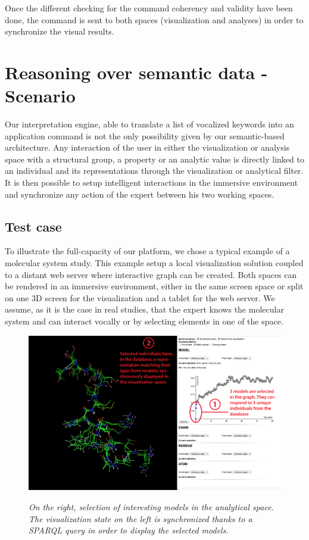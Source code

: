 \documentclass{vgtc}                          %
\begin{document}
Once the different checking for the command coherency and validity have been done, the command is sent to both spaces (visualization and analyses) in order to synchronize the visual results.

\section{Reasoning over semantic data - Scenario}

Our interpretation engine, able to translate a list of vocalized keywords into an application command is not the only possibility given by our semantic-based architecture. Any interaction of the user in either the visualization or analysis space with a structural group, a property or an analytic value is directly linked to an individual and its representations through the visualization or analytical filter. It is then possible to setup intelligent interactions in the immersive environment and synchronize any action of the expert between his two working spaces.

\subsection{Test case}

To illustrate the full-capacity of our platform, we chose a typical example of a molecular system study. This example setup a local visualization solution coupled to a distant web server where interactive graph can be created. Both spaces can be rendered in an immersive environment, either in the same screen space or split on one 3D screen for the visualization and a tablet for the web server. We assume, as it is the case in real studies, that the expert knows the molecular system and can interact vocally or by selecting elements in one of the space.

\begin{figure}[!htb]
  \centering
  {\includegraphics[width=\linewidth,frame]{./figures/scenario_step_1_cropped}}
    \caption[]{{\it On the right, selection of interesting models in the analytical space. The visualization state on the left is synchronized thanks to a SPARQL query in order to display the selected models.}}
  \label{Fig:1st_step}
\end{figure}
\end{document}
